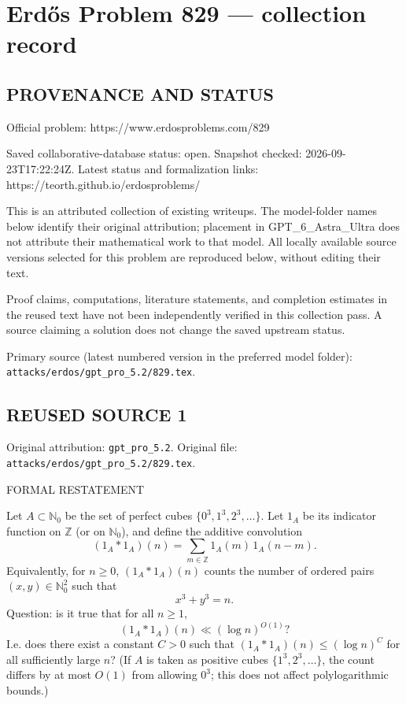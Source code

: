 \section*{Erd\H{o}s Problem 829 --- collection record}

\subsection*{PROVENANCE AND STATUS}
Official problem: https://www.erdosproblems.com/829

Saved collaborative-database status: open.
Snapshot checked: 2026-09-23T17:22:24Z.
Latest status and formalization links: https://teorth.github.io/erdosproblems/

This is an attributed collection of existing writeups. The model-folder names below identify their original attribution; placement in GPT\_6\_Astra\_Ultra does not attribute their mathematical work to that model. All locally available source versions selected for this problem are reproduced below, without editing their text.

Proof claims, computations, literature statements, and completion estimates in the reused text have not been independently verified in this collection pass. A source claiming a solution does not change the saved upstream status.

Primary source (latest numbered version in the preferred model folder): \texttt{attacks/erdos/gpt\_pro\_5.2/829.tex}.

\subsection*{REUSED SOURCE 1}
Original attribution: \texttt{gpt\_pro\_5.2}.
Original file: \texttt{attacks/erdos/gpt\_pro\_5.2/829.tex}.


FORMAL RESTATEMENT

Let $A\subset\mathbb{N}_0$ be the set of perfect cubes $\{0^3,1^3,2^3,\dots\}$. Let $1_A$ be its indicator function on $\mathbb{Z}$ (or on $\mathbb{N}_0$), and define the additive convolution
\[
(1_A*1_A)(n)=\sum_{m\in\mathbb{Z}} 1_A(m)\,1_A(n-m).
\]
Equivalently, for $n\ge 0$, $(1_A*1_A)(n)$ counts the number of ordered pairs $(x,y)\in\mathbb{N}_0^2$ such that
\[
 x^3+y^3=n.
\]
Question: is it true that for all $n\ge 1$,
\[
(1_A*1_A)(n) \ll (\log n)^{O(1)}?
\]
I.e. does there exist a constant $C>0$ such that $(1_A*1_A)(n)\le (\log n)^C$ for all sufficiently large $n$?
(If $A$ is taken as positive cubes $\{1^3,2^3,\dots\}$, the count differs by at most $O(1)$ from allowing $0^3$; this does not affect polylogarithmic bounds.)

